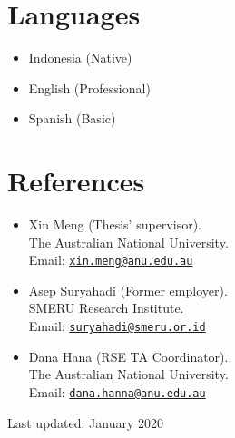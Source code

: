 \section*{Languages}
\begin{itemize}
\item Indonesia (Native)
\item English (Professional)
\item Spanish (Basic)
\end{itemize}

\section*{References}
\begin{itemize}
	\item Xin Meng  (Thesis' supervisor). \\
	The Australian National University. \\
	Email:  \href{mailto:xin.meng@anu.edu.au}{\tt xin.meng@anu.edu.au}

	\item Asep Suryahadi (Former employer). \\
	SMERU Research Institute.  \\
	Email: \href{mailto:suryahadi@smeru.or.id}{\tt suryahadi@smeru.or.id}

	\item Dana Hana (RSE TA Coordinator). \\
	The Australian National University. \\
	Email: \href{mailto:dana.hanna@anu.edu.au}{\tt dana.hanna@anu.edu.au}
\end{itemize}

\bigskip

\begin{center}
  \begin{footnotesize}
    Last updated: January 2020 \\
  \end{footnotesize}
\end{center}

